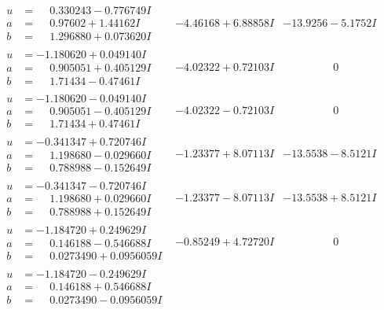 \documentclass[1p]{elsarticle_modified}
\theoremstyle{definition}
\begin{document}
$$\begin{array}{c|c|c}
\begin{aligned}
u &= \phantom{-}0.330243 - 0.776749 I \\
a &= \phantom{-}0.97602 + 1.44162 I \\
b &= \phantom{-}1.296880 + 0.073620 I\end{aligned}
 & -4.46168 + 6.88858 I & -13.9256 - 5.1752 I \\ \hline\begin{aligned}
u &= -1.180620 + 0.049140 I \\
a &= \phantom{-}0.905051 + 0.405129 I \\
b &= \phantom{-}1.71434 - 0.47461 I\end{aligned}
 & -4.02322 + 0.72103 I & \phantom{-0.000000 } 0 \\ \hline\begin{aligned}
u &= -1.180620 - 0.049140 I \\
a &= \phantom{-}0.905051 - 0.405129 I \\
b &= \phantom{-}1.71434 + 0.47461 I\end{aligned}
 & -4.02322 - 0.72103 I & \phantom{-0.000000 } 0 \\ \hline\begin{aligned}
u &= -0.341347 + 0.720746 I \\
a &= \phantom{-}1.198680 - 0.029660 I \\
b &= \phantom{-}0.788988 - 0.152649 I\end{aligned}
 & -1.23377 + 8.07113 I & -13.5538 - 8.5121 I \\ \hline\begin{aligned}
u &= -0.341347 - 0.720746 I \\
a &= \phantom{-}1.198680 + 0.029660 I \\
b &= \phantom{-}0.788988 + 0.152649 I\end{aligned}
 & -1.23377 - 8.07113 I & -13.5538 + 8.5121 I \\ \hline\begin{aligned}
u &= -1.184720 + 0.249629 I \\
a &= \phantom{-}0.146188 - 0.546688 I \\
b &= \phantom{-}0.0273490 + 0.0956059 I\end{aligned}
 & -0.85249 + 4.72720 I & \phantom{-0.000000 } 0 \\ \hline\begin{aligned}
u &= -1.184720 - 0.249629 I \\
a &= \phantom{-}0.146188 + 0.546688 I \\
b &= \phantom{-}0.0273490 - 0.0956059 I\end{aligned}

\end{array}$$
\end{document}
